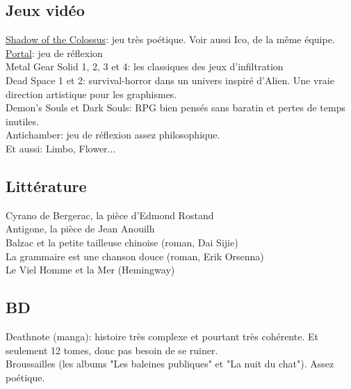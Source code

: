 \subsection{Jeux vidéo}
\href{http://www.jeuxvideo.com/jeux/playstation-3-ps3/00037095-classics-hd-ico-shadow-of-the-colossus.htm}{Shadow of the Colossus}: jeu très poétique. Voir aussi Ico, de la même équipe.\\
\href{http://www.jeuxvideo.com/jeux/playstation-3-ps3/00020227-portal.htm}{Portal}: jeu de réflexion\\
Metal Gear Solid 1, 2, 3 et 4: les classiques des jeux d'infiltration\\
Dead Space 1 et 2: survival-horror dans un univers inspiré d'Alien. Une vraie direction artistique pour les graphismes.\\
Demon's Souls et Dark Souls: RPG bien pensés sans baratin et pertes de temps inutiles.\\
Antichamber: jeu de réflexion assez philosophique.\\
Et aussi: Limbo, Flower...\\

\subsection{Littérature}
Cyrano de Bergerac, la pièce d'Edmond Rostand\\
Antigone, la pièce de Jean Anouilh\\
Balzac et la petite tailleuse chinoise (roman, Dai Sijie)\\
La grammaire est une chanson douce (roman, Erik Orsenna)\\
Le Viel Homme et la Mer (Hemingway)\\

\subsection{BD}
Deathnote (manga): histoire très complexe et pourtant très cohérente. Et seulement 12 tomes, donc pas besoin de se ruiner.\\
Broussailles (les albums "Les baleines publiques" et "La nuit du chat"). Assez poétique.\\






